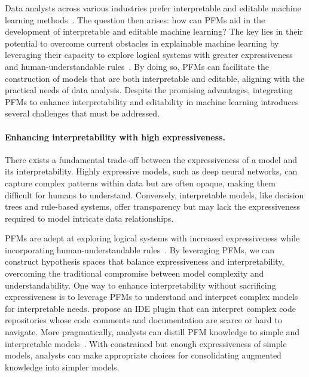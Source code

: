   Data analysts across various industries prefer interpretable and editable machine learning methods~\cite{vertsel2024hybrid,gerussi2022llm,Zhang2024LargeLM,truhn2023large}. The question then arises: how can PFMs aid in the development of interpretable and editable machine learning? The key lies in their potential to overcome current obstacles in explainable machine learning by leveraging their capacity to explore logical systems with greater expressiveness and human-understandable rules~\cite{reizingerposition}. By doing so, PFMs can facilitate the construction of models that are both interpretable and editable, aligning with the practical needs of data analysis. Despite the promising advantages, integrating PFMs to enhance interpretability and editability in machine learning introduces several challenges that must be addressed.
  
  \paragraph{Enhancing interpretability with high expressiveness.}
  
  There exists a fundamental trade-off between the expressiveness of a model and its interpretability. Highly expressive models, such as deep neural networks, can capture complex patterns within data but are often opaque, making them difficult for humans to understand. Conversely, interpretable models, like decision trees and rule-based systems, offer transparency but may lack the expressiveness required to model intricate data relationships.
  
  PFMs are adept at exploring logical systems with increased expressiveness while incorporating human-under\-standable rules~\cite{reizingerposition}. By leveraging PFMs, we can construct hypothesis spaces that balance expressiveness and interpretability, overcoming the traditional compromise between model complexity and understandability. One way to enhance interpretability without sacrificing expressiveness is to leverage PFMs to understand and interpret complex models for interpretable needs. \cite{nam2024using} propose an IDE plugin that can interpret complex code repositories whose code comments and documentation are scarce or hard to navigate. More pragmatically, analysts can distill PFM knowledge to simple and interpretable models~\cite{singh2023augmenting}. With constrained but enough expressiveness of simple models, analysts can make appropriate choices for consolidating augmented knowledge into simpler models.
  
